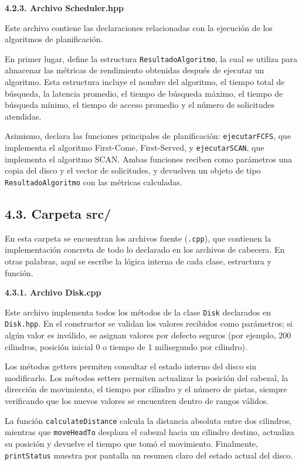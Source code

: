 \documentclass[14pt,letterpaper]{extarticle}
\begin{document}
\textbf{4.2.3. Archivo Scheduler.hpp}

Este archivo contiene las declaraciones relacionadas con la ejecución de los algoritmos de planificación.

En primer lugar, define la estructura \texttt{ResultadoAlgoritmo}, la cual se utiliza para almacenar las métricas de rendimiento obtenidas después de ejecutar un algoritmo. Esta estructura incluye el nombre del algoritmo, el tiempo total de búsqueda, la latencia promedio, el tiempo de búsqueda máximo, el tiempo de búsqueda mínimo, el tiempo de acceso promedio y el número de solicitudes atendidas.

Asimismo, declara las funciones principales de planificación: \texttt{ejecutarFCFS}, que implementa el algoritmo First-Come, First-Served, y \texttt{ejecutarSCAN}, que implementa el algoritmo SCAN. Ambas funciones reciben como parámetros una copia del disco y el vector de solicitudes, y devuelven un objeto de tipo \texttt{ResultadoAlgoritmo} con las métricas calculadas.

\subsection*{4.3. Carpeta src/}

En esta carpeta se encuentran los archivos fuente (\texttt{.cpp}), que contienen la implementación concreta de todo lo declarado en los archivos de cabecera. En otras palabras, aquí se escribe la lógica interna de cada clase, estructura y función.

\textbf{4.3.1. Archivo Disk.cpp}

Este archivo implementa todos los métodos de la clase \texttt{Disk} declarados en \texttt{Disk.hpp}. En el constructor se validan los valores recibidos como parámetros; si algún valor es inválido, se asignan valores por defecto seguros (por ejemplo, 200 cilindros, posición inicial 0 o tiempo de 1 milisegundo por cilindro).

Los métodos getters permiten consultar el estado interno del disco sin modificarlo. Los métodos setters permiten actualizar la posición del cabezal, la dirección de movimiento, el tiempo por cilindro y el número de pistas, siempre verificando que los nuevos valores se encuentren dentro de rangos válidos.

La función \texttt{calculateDistance} calcula la distancia absoluta entre dos cilindros, mientras que \texttt{moveHeadTo} desplaza el cabezal hacia un cilindro destino, actualiza su posición y devuelve el tiempo que tomó el movimiento. Finalmente, \texttt{printStatus} muestra por pantalla un resumen claro del estado actual del disco.
\end{document}
